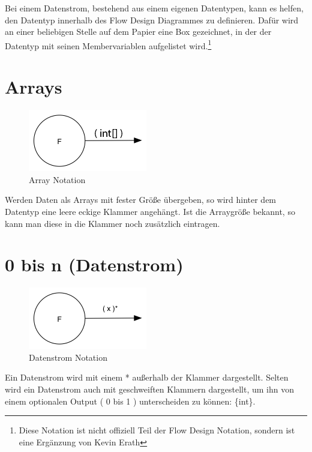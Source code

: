 Bei einem Datenstrom, bestehend aus einem eigenen Datentypen, kann es helfen, den Datentyp innerhalb des Flow Design Diagrammes zu definieren.
Dafür wird an einer beliebigen Stelle auf dem Papier eine Box gezeichnet,
in der der Datentyp mit seinen Membervariablen aufgelistet wird.\footnote{Diese Notation ist nicht offiziell Teil der Flow Design Notation,
sondern ist eine Ergänzung von Kevin Erath}

\section{Arrays}

\begin{figure}[H]
	\centering
		\includegraphics[width=.5\linewidth]{./img/diagramArray.png}
	\caption{Array Notation}
\end{figure}

Werden Daten als Arrays mit fester Größe übergeben, so wird hinter dem Datentyp eine leere eckige Klammer angehängt.
Ist die Arraygröße bekannt, so kann man diese in die Klammer noch zusätzlich eintragen.



\section{0 bis n (Datenstrom)}


\begin{figure}[H]
	\centering
	\includegraphics[width=.5\linewidth]{./img/diagram0n.png}
	\caption{Datenstrom Notation}
\end{figure}



Ein Datenstrom wird mit einem * außerhalb der Klammer dargestellt.
Selten wird ein Datenstrom auch mit geschweiften Klammern dargestellt, um ihn
von einem optionalen Output ( 0 bis 1 ) unterscheiden zu können: \{int\}.

